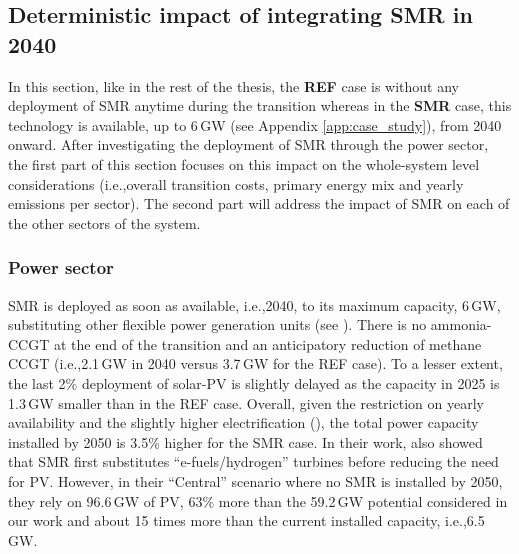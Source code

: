 \documentclass[11pt,twoside,a4paper,english]{article}
\def\ie{i.e.,}
\begin{document}
\subsection[Deterministic impact of integrating SMR in 2040]{Deterministic impact of integrating \gls{SMR} in 2040}
\label{subsec:atom_mol:results_deter} 
In this section, like in the rest of the thesis, the \textbf{REF} case is without any deployment of \gls{SMR} anytime during the transition whereas in the \textbf{SMR} case, this technology is available, up to 6\,GW (see Appendix \ref{app:case_study}), from 2040 onward. After investigating the deployment of \gls{SMR} through the power sector, the first part of this section focuses on this impact on the whole-system level considerations (\ie overall transition costs, primary energy mix and yearly emissions per sector). The second part will address the impact of \gls{SMR} on each of the other sectors of the system.

\subsubsection{Power sector}
\label{subsubsec:atom_mol:results_deter_power_sector}
\gls{SMR} is deployed as soon as available, \ie 2040, to its maximum capacity, 6\,GW, substituting other flexible power generation units (see ). There is no ammonia-\gls{CCGT} at the end of the transition and an anticipatory reduction of methane \gls{CCGT} (\ie 2.1\,GW in 2040 versus 3.7\,GW for the REF case). To a lesser extent, the last 2\% deployment of solar-\gls{PV} is slightly delayed as the capacity in 2025 is 1.3\,GW smaller than in the REF case. Overall, given the restriction on yearly availability and the slightly higher electrification (), the total power capacity installed by 2050 is 3.5\% higher for the SMR case. In their work, \citet{PATHS2050} also showed that \gls{SMR} first substitutes ``e-fuels/hydrogen'' turbines before reducing the need for \gls{PV}. However, in their ``Central'' scenario where no \gls{SMR} is installed by 2050, they rely on 96.6\,GW of \gls{PV}, 63\% more than the 59.2\,GW potential considered in our work and about 15 times more than the current installed capacity, \ie 6.5\,GW. 
\end{document}
